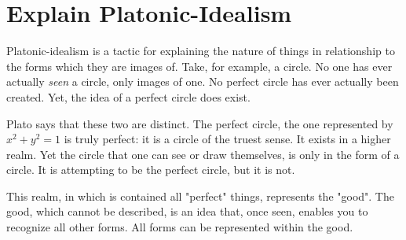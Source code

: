 \section{Explain Platonic-Idealism}
Platonic-idealism is a tactic for explaining the nature of things in
relationship to the forms which they are images of. Take, for example, a circle.
No one has ever actually \textit{seen} a circle, only images of one. No perfect
circle has ever actually been created. Yet, the idea of a perfect circle does
exist.

Plato says that these two are distinct. The perfect circle, the one represented
by $x^2+y^2=1$ is truly perfect: it is a circle of the truest sense. It exists
in a higher realm. Yet the circle that one can see or draw themselves, is only
in the form of a circle. It is attempting to be the perfect circle, but it is
not.

This realm, in which is contained all "perfect" things, represents the "good".
The good, which cannot be described, is an idea that, once seen, enables you to
recognize all other forms. All forms can be represented within the good.
